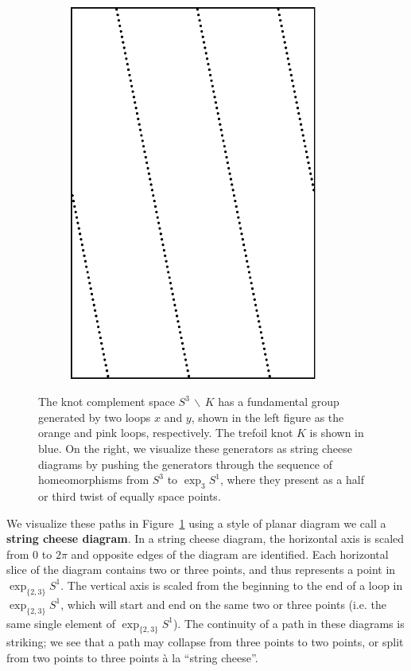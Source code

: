 \documentclass[12pt,twoside]{reedthesis}
\theoremstyle{definition}
\newcommand{\exptwothree}{\exp_{\{2,3\}}}
\newcommand{\wo}{\, \backslash \,}
\newcommand{\defnphrase}[1]{\textbf{#1}}
\begin{document}
\begin{figure}[t]
\begin{subfigure}[c]{0.32\textwidth}
  \end{subfigure}
  \hfill
  \begin{subfigure}[c]{0.32\textwidth}
    \centering
    \includegraphics[width=0.9\textwidth]{figures/antipodal_subset_path_2.pdf}
  \end{subfigure}
  \caption{The knot complement space $S^3 \wo K$ has a fundamental group generated by two loops $x$ and $y$, shown in the left figure as the orange and pink loops, respectively. The trefoil knot $K$ is shown in blue. On the right, we visualize these generators as string cheese diagrams by pushing the generators through the sequence of homeomorphisms from $S^3$ to $\exp_3 S^1$, where they present as a half or third twist of equally space points.}
  \label{fig:antipodal_point_paths}
\end{figure}


We visualize these paths in Figure~\ref{fig:antipodal_point_paths} using a style of planar diagram we call a \defnphrase{string cheese diagram}.
In a string cheese diagram, the horizontal axis is scaled from 0 to $2\pi$ and opposite edges of the diagram are identified.
Each horizontal slice of the diagram contains two or three points, and thus represents a point in $\exptwothree S^1$.
The vertical axis is scaled from the beginning to the end of a loop in $\exptwothree S^1$, which will start and end on the same two or three points (i.e. the same single element of $\exptwothree S^1$).
The continuity of a path in these diagrams is striking; we see that a path may collapse from three points to two points, or split from two points to three points \` a la ``string cheese''.
\end{document}
